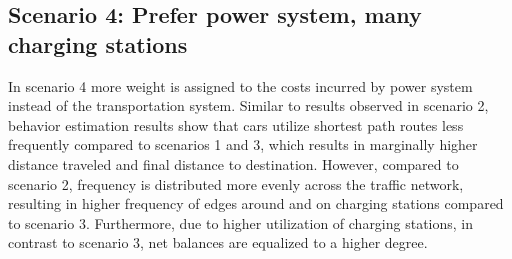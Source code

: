 \subsection*{Scenario 4: Prefer power system, many charging stations}

In scenario 4 more weight is assigned to the costs incurred by power system instead of the transportation system. Similar to results observed in scenario 2, behavior estimation results show that cars utilize shortest path routes less frequently compared to scenarios 1 and 3, which results in marginally higher distance traveled and final distance to destination. However, compared to scenario 2, frequency is distributed more evenly across the traffic network, resulting in higher frequency of edges around and on charging stations compared to scenario 3. Furthermore, due to higher utilization of charging stations, in contrast to scenario 3, net balances are equalized to a higher degree.